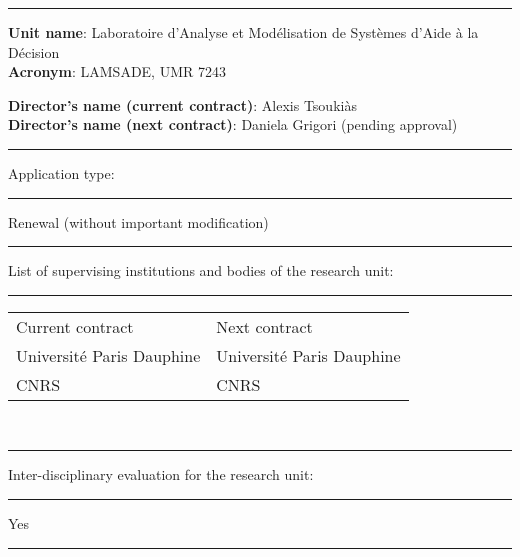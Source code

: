 \documentclass[version=last, pagesize, twoside=semi, DIV=calc, 12pt, a4paper, french, english, bibliography=totoc]{scrartcl}
\begin{document}
\vspace{2em} 
\noindent\textcolor{redh}{\rule{\columnwidth}{1pt}}\par

\noindent
\textbf{Unit name}: Laboratoire d'Analyse et Modélisation de Systèmes d'Aide à la Décision \\
\textbf{Acronym}: LAMSADE, UMR 7243

\vspace{1em}

\noindent
\textbf{Director's name (current contract)}: Alexis Tsoukiàs \\
\textbf{Director's name (next contract)}: Daniela Grigori (pending approval)\\
\noindent\textcolor{redh}{\rule{\columnwidth}{1pt}}\par

\vspace{1em}

\noindent
Application type: 

\noindent\textcolor{redh}{\rule{\columnwidth}{1pt}}\par
Renewal (without important modification) \\%
\noindent\textcolor{redh}{\rule{\columnwidth}{1pt}}\par

\vspace{1em}

\noindent
List of supervising institutions and bodies of the research unit:

\noindent\textcolor{redh}{\rule{\columnwidth}{1pt}}\par
\begin{tabular}{ll}
		Current contract & Next contract \\
		Université Paris Dauphine & Université Paris Dauphine \\
		CNRS & CNRS \\
\end{tabular}\\
\noindent\textcolor{redh}{\rule{\columnwidth}{1pt}}\par 

\vspace{1em}

\noindent
Inter-disciplinary evaluation for the research unit: 

\noindent\textcolor{redh}{\rule{\columnwidth}{1pt}}\par
Yes \\
\noindent\textcolor{redh}{\rule{\columnwidth}{1pt}}\par
\end{document}
